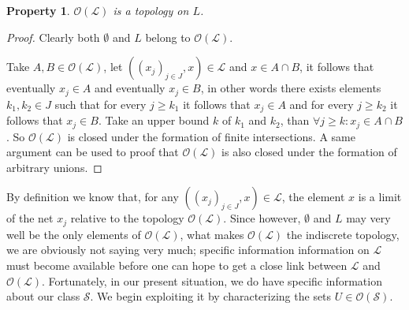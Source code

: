 \documentclass[a4paper,12pt]{article}
\newtheorem{property}[theorem]{Property}
\begin{document}
\begin{property}
$\mathcal{O}(\mathcal{L})$ is a topology on $L$.
\end{property}
\begin{proof}
Clearly both $\emptyset$ and $L$ belong to $\mathcal{O}(\mathcal{L})$.

Take $A, B \in \mathcal{O}(\mathcal{L})$, let $((x_j)_{j\in J}, x) \in \mathcal{L}$ and $x \in A \cap B$, it follows that eventually $x_j \in A$ and eventually $x_j \in B$, in other words there exists elements $k_1, k_2 \in J$  such that for every $j \geq k_1$ it follows that $x_j \in A$ and for every $j \geq k_2$ it follows that $x_j \in B$. Take an upper bound $k$ of $k_1$ and $k_2$, than $\forall j \geq k: x_j \in A \cap B$. So $\mathcal{O}(\mathcal{L})$ is closed under the formation of finite intersections. A same argument can be used to proof that $\mathcal{O}(\mathcal{L})$ is also closed under the formation of arbitrary unions.
\end{proof}

By definition we know that, for any $((x_j)_{j\in J}, x) \in \mathcal{L}$, the element $x$ is a limit of the net $x_j$ relative to the topology $\mathcal{O}(\mathcal{L})$. Since however, $\emptyset$ and $L$ may very well be the only elements of $\mathcal{O}(\mathcal{L})$, what makes $\mathcal{O}(\mathcal{L})$ the indiscrete topology, we are obviously not saying very much; specific information information on $\mathcal{L}$ must become available before one can hope to get a close link between $\mathcal{L}$ and $\mathcal{O}(\mathcal{L})$. Fortunately, in our present situation, we do have specific information about our class $\mathcal{S}$. We begin exploiting it by characterizing the sets $U \in \mathcal{O}(\mathcal{S})$.
\end{document}
